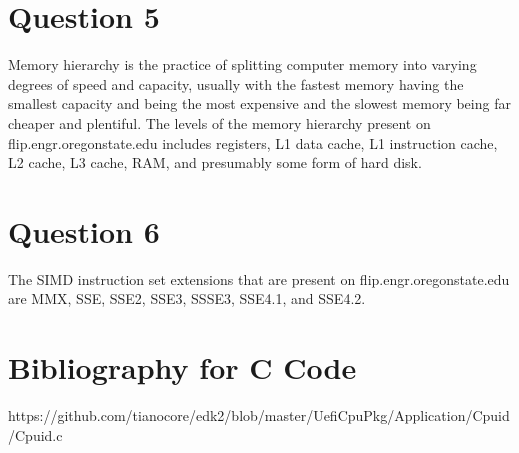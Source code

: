 \documentclass[12pt]{article}%
\begin{document}
\section{Question 5}
Memory hierarchy is the practice of splitting computer memory into varying degrees of speed and capacity, usually with the fastest memory having the smallest capacity and being the most expensive and the slowest memory being far cheaper and plentiful. The levels of the memory hierarchy present on flip.engr.oregonstate.edu includes registers, L1 data cache, L1 instruction cache, L2 cache, L3 cache, RAM, and presumably some form of hard disk. 
\section{Question 6}
The SIMD instruction set extensions that are present on flip.engr.oregonstate.edu are MMX, SSE, SSE2, SSE3, SSSE3, SSE4.1, and SSE4.2.
\section{Bibliography for C Code}
https://github.com/tianocore/edk2/blob/master/UefiCpuPkg/Application/Cpuid/Cpuid.c
\end{document}
